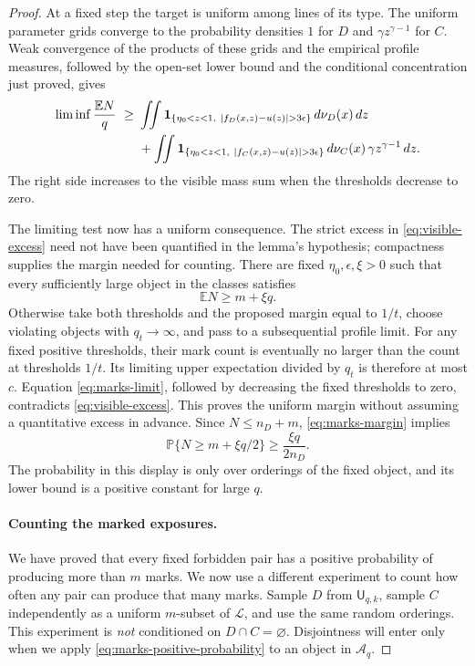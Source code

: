 \begin{proof}
At a fixed step the target is uniform among lines of its type.  The
uniform parameter grids converge to the probability densities $1$ for
$D$ and $\gamma z^{\gamma-1}$ for $C$.  Weak convergence of the products
of these grids and the empirical profile measures, followed by the
open-set lower bound and the conditional concentration just proved,
gives
\begin{align}
 \liminf\frac{\mathbb E N}{q}\ \ge\ &
 \iint\mathbf1_{\{\eta_0<z<1,\ |f_D(x,z)-u(z)|>3\epsilon\}}
            \,d\nu_D(x)\,dz \notag\\
 &+\iint\mathbf1_{\{\eta_0<z<1,\ |f_C(x,z)-u(z)|>3\epsilon\}}
            \,d\nu_C(x)\,\gamma z^{\gamma-1}\,dz.
 \label{eq:marks-limit}
\end{align}
The right side increases to the visible mass sum when the thresholds
decrease to zero.

The limiting test now has a uniform consequence. The strict excess in
\eqref{eq:visible-excess} need not have been quantified in the lemma's
hypothesis; compactness supplies the margin needed for counting.
There are fixed $\eta_0,\epsilon,\xi>0$ such that every sufficiently large
object in the classes satisfies
\begin{equation}\label{eq:marks-margin}
 \mathbb E N\ge m+\xi q.
\end{equation}
Otherwise take both thresholds and the proposed margin equal to $1/t$,
choose violating objects with $q_t\to\infty$, and pass to a subsequential
profile limit.  For any fixed positive thresholds, their mark count is
eventually no larger than the count at thresholds $1/t$.  Its limiting
upper expectation divided by $q_t$ is therefore at most $c$.  Equation
\eqref{eq:marks-limit}, followed by decreasing the fixed thresholds to
zero, contradicts \eqref{eq:visible-excess}.  This proves the uniform
margin without assuming a quantitative excess in advance.  Since
$N\le n_D+m$, \eqref{eq:marks-margin} implies
\begin{equation}\label{eq:marks-positive-probability}
 \mathbb P\{N\ge m+\xi q/2\}\ge\frac{\xi q}{2n_D}.
\end{equation}
The probability in this display is only over orderings of the fixed
object, and its lower bound is a positive constant for large $q$.

\paragraph{Counting the marked exposures.}
We have proved that every fixed forbidden pair has a positive probability
of producing more than $m$ marks. We now use a different experiment to
count how often any pair can produce that many marks.  Sample $D$ from
$\mathsf U_{q,k}$, sample $C$ independently as a uniform $m$-subset of
$\mathcal L$, and use the same random orderings.  This experiment is
\emph{not} conditioned on $D\cap C=\varnothing$.  Disjointness will enter
only when we apply \eqref{eq:marks-positive-probability} to an object in
$\mathscr A_q$.


\end{proof}
